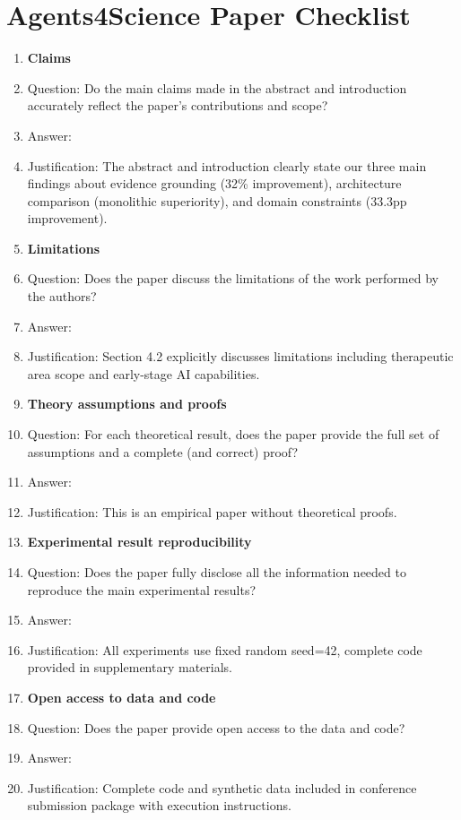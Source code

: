 \documentclass{article}
\begin{document}
\newpage

\section*{Agents4Science Paper Checklist}

\begin{enumerate}

\item {\bf Claims}
    \item[] Question: Do the main claims made in the abstract and introduction accurately reflect the paper's contributions and scope?
    \item[] Answer: \answerYes{}
    \item[] Justification: The abstract and introduction clearly state our three main findings about evidence grounding (32\% improvement), architecture comparison (monolithic superiority), and domain constraints (33.3pp improvement).
    
\item {\bf Limitations}
    \item[] Question: Does the paper discuss the limitations of the work performed by the authors?
    \item[] Answer: \answerYes{}
    \item[] Justification: Section 4.2 explicitly discusses limitations including therapeutic area scope and early-stage AI capabilities.

\item {\bf Theory assumptions and proofs}
    \item[] Question: For each theoretical result, does the paper provide the full set of assumptions and a complete (and correct) proof?
    \item[] Answer: \answerNA{}
    \item[] Justification: This is an empirical paper without theoretical proofs.

\item {\bf Experimental result reproducibility}
    \item[] Question: Does the paper fully disclose all the information needed to reproduce the main experimental results?
    \item[] Answer: \answerYes{}
    \item[] Justification: All experiments use fixed random seed=42, complete code provided in supplementary materials.

\item {\bf Open access to data and code}
    \item[] Question: Does the paper provide open access to the data and code?
    \item[] Answer: \answerYes{}
    \item[] Justification: Complete code and synthetic data included in conference submission package with execution instructions.


\end{enumerate}
\end{document}
